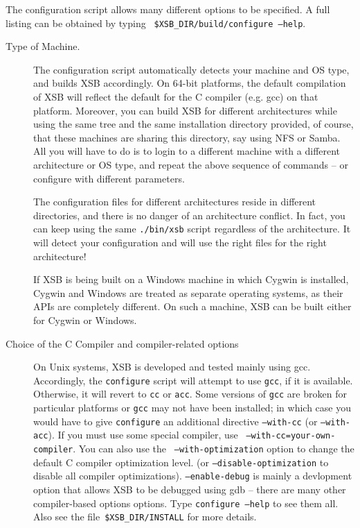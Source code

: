 The configuration script allows many different options to be
specified.  A full listing can be obtained by typing {\tt
\$XSB\_DIR/build/configure --help}.
\begin{description}
\item[Type of Machine.]  The configuration script automatically
  detects your machine and OS type, and builds XSB accordingly. On
  64-bit platforms, the default compilation of XSB will reflect the
  default for the C compiler (e.g. gcc) on that platform.  Moreover,
  you can build XSB for different architectures while using the same
  tree and the same installation directory provided, of course, that
  these machines are sharing this directory, say using NFS or
  Samba. All you will have to do is to login to a different machine
  with a different architecture or OS type, and repeat the above
  sequence of commands -- or configure with different parameters.
  
  The configuration files for different architectures reside in
  different directories, and there is no danger of an architecture
  conflict.  In fact, you can keep using the same {\tt ./bin/xsb}
  script regardless of the architecture. It will detect your
  configuration and will use the right files for the right
  architecture!

  If XSB is being built on a Windows machine in which Cygwin
  is installed, Cygwin and Windows are treated as separate operating
  systems, as their APIs are completely different.  On such a machine, XSB
  can be built either for Cygwin or Windows.

    
\item[Choice of the C Compiler and compiler-related
  options] \label{cc} On Unix systems, XSB is developed and tested
  mainly using gcc.  Accordingly, the {\tt configure} script will
  attempt to use {\tt gcc}, if it is available.  Otherwise, it will
  revert to {\tt cc} or {\tt acc}.  Some versions of {\tt gcc} are
  broken for particular platforms or {\tt gcc} may not have been
  installed; in which case you would have to give {\tt configure} an
  additional directive {\tt --with-cc} (or {\tt --with-acc}).  If you
  must use some special compiler, use {\tt
    --with-cc=your-own-compiler}.  You can also use the {\tt
    --with-optimization} option to change the default C compiler
  optimization level.  (or {\tt --disable-optimization} to disable all
  compiler optimizations).  {\tt --enable-debug} is mainly a
  devlopment option that allows XSB to be debugged using gdb -- there
  are many other compiler-based options options.  Type {\tt configure
    --help} to see them all. Also see the file~\verb'$XSB_DIR/INSTALL'
  for more details.


\end{description}
